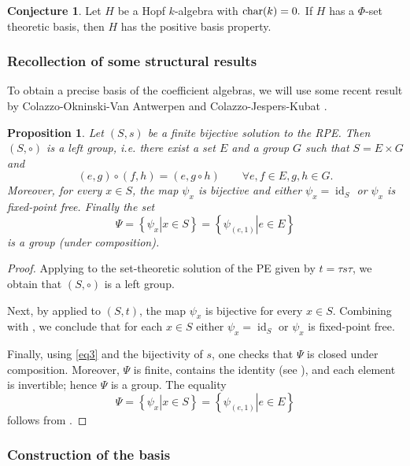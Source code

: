 \documentclass[a4paper,10pt]{amsart}
\newtheorem{proposition}[lemma]{Proposition}
\theoremstyle{definition}
\newtheorem{conjecture}[lemma]{Conjecture}
\theoremstyle{remark}
\DeclareMathOperator{\id}{id}
\newcommand\Char{{\rm char}}
\begin{document}
\begin{conjecture}\label{conjecture on positive basis}
Let $H$ be a Hopf $k$-algebra with $\Char(k)=0.$ If $H$ has a $\Phi$-set theoretic basis, then $H$ has the positive basis property.
\end{conjecture}

\subsubsection{Recollection of some structural results}

To obtain a precise basis of the coefficient algebras, we will use some recent result by Colazzo-Okninski-Van Antwerpen \cite[Proposition 2.4]{COvA} and Colazzo-Jespers-Kubat \cite[Lemma 2.4]{CJK}. 

\begin{proposition}\label{prop:structureSs} 
    Let $(S,s)$ be a finite bijective solution to the RPE. Then $(S, \circ)$ is a left group, i.e. there exist a set $E$ and a group $G$ such that $S=E\times G$ and 
    $$(e,g)\circ (f,h) = (e,g\circ h) \qquad \forall e,f\in E, g,h\in G.$$
    Moreover, for every $x\in S$, the map $\psi_x$ is bijective and  either $\psi_x=\id_S$ or $\psi_x$ is fixed-point free.
    Finally the set $$\Psi=\left\{\left. \psi_x \right| x\in S\right\} = \left\{\left. \psi_{(e,1)} \right| e\in E \right\}$$ is a group (under composition).
\end{proposition}
\begin{proof}
    Applying \cite[Proposition 2.4]{COvA} to the set-theoretic solution of the PE given by $t=\tau s \tau$, we obtain that $(S,\circ)$ is a left group.

    Next, by \cite[Proposition 2.10]{COvA} applied to $(S,t)$, the map $\psi_x$ is bijective for every $x\in S$. Combining \cite[Proposition 2.11]{COvA} with \cite[Lemma~2.4]{CJK}, we conclude that for each $x\in S$ either $\psi_x=\id_S$ or $\psi_x$ is fixed-point free.

    Finally, using \eqref{eq3} and the bijectivity of $s$, one checks that $\Psi$ is closed under composition. Moreover, $\Psi$ is finite, contains the identity (see \cite[Proposition 2.11]{COvA}), and each element is invertible; hence $\Psi$ is a group. The equality
    $$\Psi=\left\{\left. \psi_x \right| x\in S\right\} = \left\{\left. \psi_{(e,1)} \right| e\in E\right\}$$
    follows from \cite[Proposition 2.11]{COvA}.
\end{proof}

\subsubsection{Construction of the basis}
\end{document}
